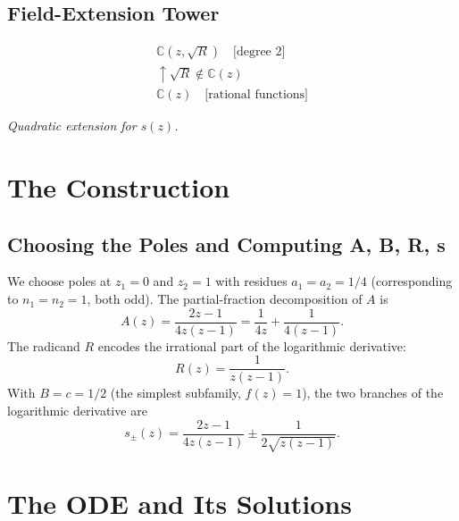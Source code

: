 \documentclass[11pt,a4paper]{article}
\theoremstyle{definition}
\begin{document}
\subsection{Field-Extension Tower}
\[
\begin{array}{c}
\mathbb{C}(z, \sqrt{R}) \quad \text{[degree 2]} \\
\uparrow \scriptstyle{\sqrt{R} \notin \mathbb{C}(z)} \\
\mathbb{C}(z) \quad \text{[rational functions]}
\end{array}
\]
\begin{center}
    \textit{Quadratic extension for \(s(z)\).}
\end{center}

\section{The Construction}

\subsection{Choosing the Poles and Computing A, B, R, s}
We choose poles at \(z_1 = 0\) and \(z_2 = 1\) with residues \(a_1 = a_2 = 1/4\) (corresponding to \(n_1 = n_2 = 1\), both odd). The partial-fraction decomposition of \(A\) is
\begin{equation*}
A(z) = \frac{2z-1}{4z(z-1)} = \frac{1}{4z} + \frac{1}{4(z-1)}.
\end{equation*}
The radicand \(R\) encodes the irrational part of the logarithmic derivative:
\begin{equation*}
R(z) = \frac{1}{z(z-1)}.
\end{equation*}
With \(B=c=1/2\) (the simplest subfamily, \(f(z)=1\)), the two branches of the logarithmic derivative are
\begin{equation*}
s_{\pm}(z) = \frac{2z-1}{4z(z-1)} \pm \frac{1}{2\sqrt{z(z-1)}}.
\end{equation*}

\section{The ODE and Its Solutions}
\end{document}
